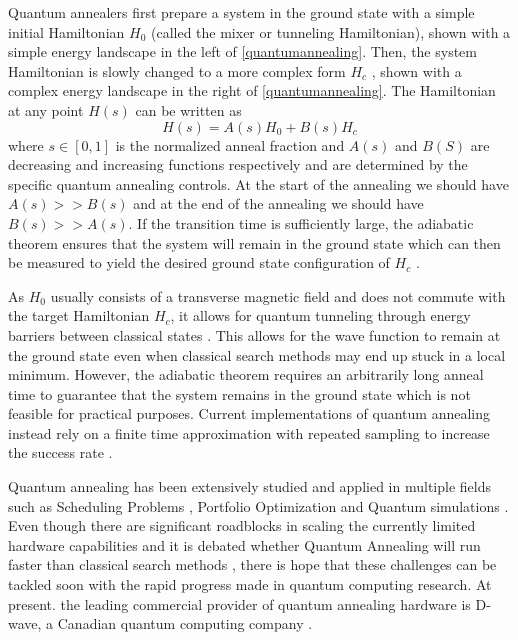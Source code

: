 Quantum annealers first prepare a system in the ground state with a simple initial Hamiltonian $H_0$ (called the mixer or tunneling Hamiltonian), shown with a simple energy landscape in the left of \autoref{quantumannealing}. Then, the system Hamiltonian is slowly changed to a more complex form $H_c$ \cite{b10}, shown with a complex energy landscape in the right of \autoref{quantumannealing}. The Hamiltonian at any point $H(s)$ can be written as
\begin{equation}
    \label{eqn:annealinghamiltonian}
    H(s) = A(s)H_0 + B(s)H_c
\end{equation}
where $s \in [0,1]$ is the normalized anneal fraction and $A(s)$ and $B(S)$ are decreasing and increasing functions respectively and are determined by the specific quantum annealing controls. At the start of the annealing we should have $A(s) >> B(s)$ and at the end of the annealing we should have $B(s) >> A(s)$. If the transition time is sufficiently large, the adiabatic theorem ensures that the system will remain in the ground state which can then be measured to yield the desired ground state configuration of $H_c$ \cite{b14}. 

As $H_0$ usually consists of a transverse magnetic field and does not commute with the target Hamiltonian $H_c$, it allows for quantum tunneling through energy barriers between classical states \cite{kadowaki1998quantum}. This allows for the wave function to remain at the ground state even when classical search methods may end up stuck in a local minimum. However, the adiabatic theorem requires an arbitrarily long anneal time to guarantee that the system remains in the ground state which is not feasible for practical purposes. Current implementations of quantum annealing instead rely on a finite time approximation with repeated sampling to increase the success rate \cite{farhi2001}.

Quantum annealing has been extensively studied and applied in multiple fields such as Scheduling Problems \cite{b17}, Portfolio Optimization \cite{b18} and Quantum simulations \cite{b19}. Even though there are significant roadblocks in scaling the currently limited hardware capabilities \cite{b14} and it is debated whether Quantum Annealing will run faster than classical search methods \cite{b10}, there is hope that these challenges can be tackled soon with the rapid progress made in quantum computing research. At present. the leading commercial provider of quantum annealing hardware is D-wave, a Canadian quantum computing company \cite{b16}.


